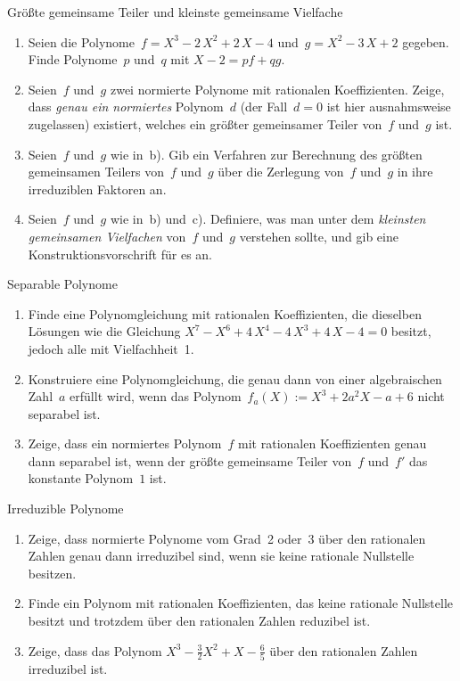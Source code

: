 \documentclass{algblatt}
\begin{document}
\vspace*{-1.5cm}
\vspace*{-0.3cm}

\begin{aufgabe}{Größte gemeinsame Teiler und kleinste gemeinsame Vielfache}
\begin{enumerate}
\item Seien die Polynome~$f = X^3 - 2\,X^2 + 2\,X - 4$
und~$g = X^2 - 3\,X + 2$ gegeben. Finde Polynome~$p$ und~$q$ mit
$X-2 = p f + q g$.
\item Seien~$f$ und~$g$ zwei normierte Polynome mit rationalen
Koeffizienten. Zeige, dass \emph{genau ein normiertes} Polynom~$d$ (der
Fall~$d = 0$ ist hier ausnahmsweise zugelassen) existiert, welches ein
größter gemeinsamer Teiler von~$f$ und~$g$ ist.
\item Seien~$f$ und~$g$ wie in~b).
Gib ein Verfahren zur Berechnung des größten gemeinsamen Teilers
von~$f$ und~$g$ über die Zerlegung von~$f$ und~$g$ in ihre
irreduziblen Faktoren an.
\item Seien~$f$ und~$g$ wie in~b) und~c). Definiere, was man unter dem
\emph{kleinsten gemeinsamen Vielfachen} von~$f$ und~$g$ verstehen sollte,
und gib eine Konstruktionsvorschrift für es an.
\end{enumerate}
\end{aufgabe}

\begin{aufgabe}{Separable Polynome}
\begin{enumerate}
\item Finde eine Polynomgleichung mit rationalen
Koeffizienten, die dieselben Lösungen wie die
Gleichung $X^7-X^6+4\,X^4-4\,X^3+4\,X-4=0$ besitzt, jedoch alle mit
Vielfachheit~1.
\item Konstruiere eine Polynomgleichung, die genau dann
von einer algebraischen Zahl~$a$ erfüllt wird, wenn das Polynom~$f_a(X) := X^3
+ 2a^2 X - a + 6$ nicht separabel ist.
\item Zeige, dass ein normiertes Polynom~$f$ mit rationalen Koeffizienten genau
dann separabel ist, 
wenn der größte gemeinsame Teiler von~$f$
und~$f'$ das konstante Polynom~$1$ ist.
\end{enumerate}
\end{aufgabe}

\begin{aufgabe}{Irreduzible Polynome}
\begin{enumerate}
\item Zeige, dass normierte Polynome vom Grad~2 oder~3 über den rationalen
Zahlen genau dann irreduzibel sind, wenn sie keine rationale Nullstelle
besitzen.
\item Finde ein Polynom mit rationalen Koeffizienten, das keine rationale
Nullstelle besitzt und trotzdem über den rationalen Zahlen reduzibel ist.
\item Zeige, dass das Polynom $X^3 - \frac{3}{2}X^2 + X - \frac{6}{5}$ über den
rationalen Zahlen irreduzibel ist.
\end{enumerate}
\end{aufgabe}
\end{document}
